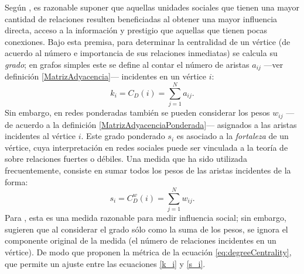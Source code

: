 \documentclass[letterpaper, 11pt]{book}
\theoremstyle{definition}
\theoremstyle{remark}
\begin{document}
Según \citet{2010_Newman_Networks}, es razonable suponer que aquellas unidades sociales que tienen una mayor cantidad de relaciones resulten beneficiadas al obtener una mayor influencia directa, acceso a la información y prestigio que aquellas que tienen pocas conexiones. 
Bajo esta premisa, para determinar la centralidad de un vértice (de acuerdo al número e importancia de sus relaciones inmediatas) se calcula su \emph{grado}; en grafos simples este se define al contar el número de aristas $a_{ij}$ ---ver definición \ref{MatrizAdyacencia}--- incidentes en un vértice $i$:
\begin{equation}\label{k_i}
    k_{i} = C_{D}(i) = \sum_{j=1}^{N}a_{ij}. 
\end{equation} 
Sin embargo, en redes ponderadas también se pueden considerar los pesos $w_{ij}$ ---de acuerdo a la definición \ref{MatrizAdyacenciaPonderada}--- asignados a las aristas incidentes al vértice $i$. 
Este grado ponderado $s_{i}$ es asociado a la \emph{fortaleza} de un vértice, cuya interpretación en redes sociales puede ser vinculada a la teoría de \citet{1983_Granovetter_WeakTies} sobre  relaciones fuertes o débiles. 
Una medida que ha sido utilizada frecuentemente, consiste en sumar todos los pesos de las aristas incidentes de la forma: 
\begin{equation}\label{s_i}
    s_{i} = C_{D}^{w}(i) = \sum_{j=1}^{N}w_{ij}.
\end{equation} 
Para \citet{2004_Newman_WeightedNet}, esta es una medida razonable para medir influencia social; sin embargo, \citet{2010_Opsahl_NodeCentralityWeighted} sugieren que al considerar el grado sólo como la suma de los pesos, se ignora el componente original de la medida (el número de relaciones incidentes en un vértice). 
De modo que proponen la métrica de la ecuación \ref{eq:degreeCentrality}, que permite un ajuste entre las ecuaciones \ref{k_i} y \ref{s_i}.
\end{document}
